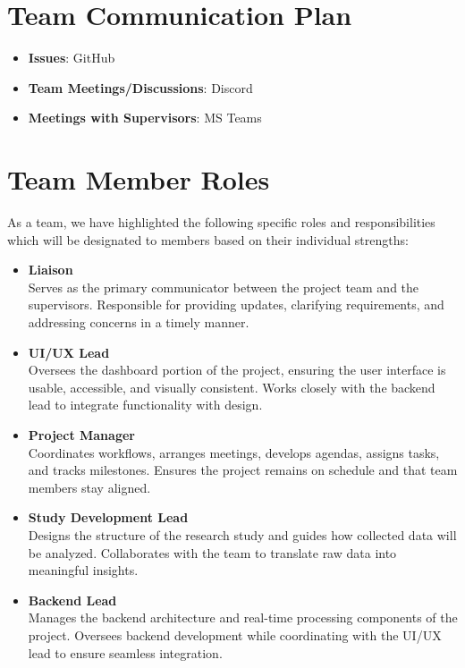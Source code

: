 \documentclass{article}
\begin{document}
\section{Team Communication Plan}

\begin{itemize}

    \item \textbf{Issues}: GitHub 
    \item \textbf{Team Meetings/Discussions}: Discord
    \item \textbf{Meetings with Supervisors}: MS Teams
    
\end{itemize}

\section{Team Member Roles}

As a team, we have highlighted the following specific roles and responsibilities which will be designated to members based on their individual strengths:

\begin{itemize}
    \item \textbf{Liaison} \\
    Serves as the primary communicator between the project team and the supervisors. Responsible for providing updates, clarifying requirements, and addressing concerns in a timely manner.
    
    \item \textbf{UI/UX Lead} \\
    Oversees the dashboard portion of the project, ensuring the user interface is usable, accessible, and visually consistent. Works closely with the backend lead to integrate functionality with design.

    \item \textbf{Project Manager} \\
    Coordinates workflows, arranges meetings, develops agendas, assigns tasks, and tracks milestones. Ensures the project remains on schedule and that team members stay aligned.

    \item \textbf{Study Development Lead} \\
    Designs the structure of the research study and guides how collected data will be analyzed. Collaborates with the team to translate raw data into meaningful insights.

    \item \textbf{Backend Lead} \\
    Manages the backend architecture and real-time processing components of the project. Oversees backend development while coordinating with the UI/UX lead to ensure seamless integration.
\end{itemize}
\end{document}
